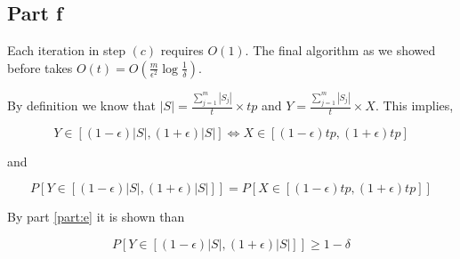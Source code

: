 \documentclass[12pt, a4paper]{article}
\begin{document}
\subsection{Part f}
Each iteration in step $(c)$ requires $O(1)$. The final algorithm as we showed
before takes $O(t) = O\left( \frac{m}{\epsilon^2}\log{\frac{1}{\delta}}
\right)$.

By definition we know that $|S| = \frac{\sum_{j=1}^{m}|S_j|}{t} \times tp$ and
$Y = \frac{\sum_{j=1}^{m}|S_j|}{t} \times X$. This implies,

\begin{equation}
  Y \in [(1 - \epsilon)|S|, (1 + \epsilon)|S|] \iff X \in [(1 - \epsilon)tp,(1 + \epsilon)tp]
\end{equation}

and

\begin{equation}
  P[Y \in [(1 - \epsilon)|S|, (1 + \epsilon)|S|]] = P[X \in [(1 - \epsilon)tp,(1 + \epsilon)tp]]
\end{equation}

By part \ref{part:e} it is shown than 

\begin{equation}
  P[Y \in [(1 - \epsilon)|S|, (1 + \epsilon)|S|]] \geq 1 - \delta
\end{equation}
\end{document}
